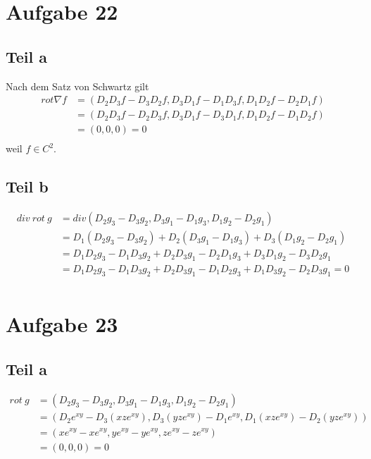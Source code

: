 \documentclass[10pt,a4paper]{article}
\begin{document}
\section*{Aufgabe 22}

\subsection*{Teil a}

Nach dem Satz von Schwartz gilt
\begin{align*}
rot \nabla f & = (D_{2}D_{3}f - D_{3}D_{2}f, D_{3}D_{1}f - D_{1}D_{3}f, D_{1}D_{2}f - D_{2}D_{1}f)\\
& = (D_{2}D_{3}f - D_{2}D_{3}f, D_{3}D_{1}f - D_{3}D_{1}f, D_{1}D_{2}f - D_{1}D_{2}f)\\
& = (0, 0, 0) = 0\\
\end{align*}
weil $f \in C^{2}$.

\subsection*{Teil b}

\begin{align*}
div\ rot\ g & = div (D_{2}g_{3} - D_{3}g_{2}, D_{3}g_{1} - D_{1}g_{3}, D_{1}g_{2} - D_{2}g_{1})\\
& = D_{1}(D_{2}g_{3} - D_{3}g_{2}) + D_{2}(D_{3}g_{1} - D_{1}g_{3}) + D_{3}(D_{1}g_{2} - D_{2}g_{1})\\
& = D_{1}D_{2}g_{3} - D_{1}D_{3}g_{2} + D_{2}D_{3}g_{1} - D_{2}D_{1}g_{3} + D_{3}D_{1}g_{2} - D_{3}D_{2}g_{1}\\
& = D_{1}D_{2}g_{3} - D_{1}D_{3}g_{2} + D_{2}D_{3}g_{1} - D_{1}D_{2}g_{3} + D_{1}D_{3}g_{2} - D_{2}D_{3}g_{1} = 0\\
\end{align*}

\section*{Aufgabe 23}

\subsection*{Teil a}

\begin{align*}
rot\ g & = (D_{2}g_{3} - D_{3}g_{2}, D_{3}g_{1} - D_{1}g_{3}, D_{1}g_{2} - D_{2}g_{1})\\
& = (D_{2}e^{xy} - D_{3}(xze^{xy}), D_{3}(yze^{xy}) - D_{1}e^{xy}, D_{1}(xze^{xy}) - D_{2}(yze^{xy}))\\
& = (xe^{xy} - xe^{xy}, ye^{xy} - ye^{xy}, ze^{xy} - ze^{xy})\\
& = (0, 0, 0) = 0\\
\end{align*}
\end{document}
